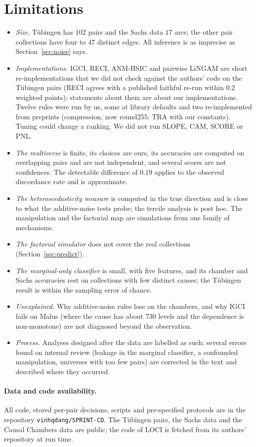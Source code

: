 \section{Limitations}\label{sec:limits}
\begin{itemize}
\item \emph{Size.} T\"ubingen has $102$ pairs and the Sachs data $17$ arcs; the other pair collections have four to $47$ distinct edges. All inference is as imprecise as Section~\ref{sec:noise} says.
\item \emph{Implementations.} IGCI, RECI, ANM-HSIC and pairwise LiNGAM are short re-implementations that we did not check against the authors' code on the T\"ubingen pairs (RECI agrees with a published faithful re-run within $0.2$ weighted points); statements about them are about our implementations. Twelve rules were run by us, some at library defaults and two re-implemented from preprints (compression, now round255; TRA with our constants). Tuning could change a ranking. We did not run SLOPE, CAM, SCORE or PNL.
\item \emph{The multiverse} is finite, its choices are ours, its accuracies are computed on overlapping pairs and are not independent, and several scores are not confidences. The detectable difference of $0.19$ applies to the observed discordance rate and is approximate.
\item \emph{The heteroscedasticity measure} is computed in the true direction and is close to what the additive-noise tests probe; the tercile analysis is post hoc. The manipulation and the factorial map are simulations from one family of mechanisms.
\item \emph{The factorial simulator} does not cover the real collections (Section~\ref{sec:predict}).
\item \emph{The marginal-only classifier} is small, with five features, and its chamber and Sachs accuracies rest on collections with few distinct causes; the T\"ubingen result is within the sampling error of chance.
\item \emph{Unexplained.} Why additive-noise rules lose on the chambers, and why IGCI fails on Malus (where the cause has about $730$ levels and the dependence is non-monotone) are not diagnosed beyond the observation.
\item \emph{Process.} Analyses designed after the data are labelled as such; several errors found on internal review (leakage in the marginal classifier, a confounded manipulation, universes with too few pairs) are corrected in the text and described where they occurred.
\end{itemize}

\paragraph{Data and code availability.} All code, stored per-pair decisions, scripts and pre-specified protocols are in the repository \texttt{vinhqdang/SPRINT-CD}. The T\"ubingen pairs, the Sachs data and the Causal Chambers data are public; the code of LOCI is fetched from its authors' repository at run time.
